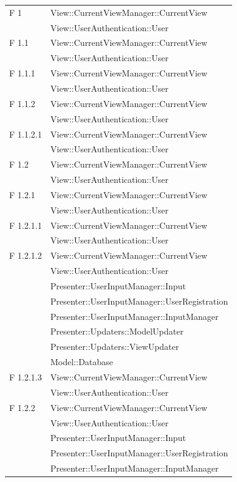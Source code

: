 \documentclass[a4paper,11pt]{article}
\begin{document}
\begin{longtable}{p{}p{}}
F 1 & View::CurrentViewManager::CurrentView\\
	& View::UserAuthentication::User\\
\midrule
F 1.1 & View::CurrentViewManager::CurrentView\\
	& View::UserAuthentication::User\\
\midrule
F 1.1.1 & View::CurrentViewManager::CurrentView\\
	& View::UserAuthentication::User\\
\midrule
F 1.1.2 & View::CurrentViewManager::CurrentView\\
	& View::UserAuthentication::User\\
\midrule
F 1.1.2.1 & View::CurrentViewManager::CurrentView\\
	& View::UserAuthentication::User\\
\midrule
F 1.2 & View::CurrentViewManager::CurrentView\\
	& View::UserAuthentication::User\\
\midrule
F 1.2.1 & View::CurrentViewManager::CurrentView\\
	& View::UserAuthentication::User\\
\midrule
F 1.2.1.1 & View::CurrentViewManager::CurrentView\\
	& View::UserAuthentication::User\\
\midrule
F 1.2.1.2 & View::CurrentViewManager::CurrentView\\
			& View::UserAuthentication::User\\
			& Presenter::UserInputManager::Input\\
			& Presenter::UserInputManager::UserRegistration\\
			& Presenter::UserInputManager::InputManager\\
			& Presenter::Updaters::ModelUpdater\\
			& Presenter::Updaters::ViewUpdater\\
			& Model::Database\\
\midrule
F 1.2.1.3 	& View::CurrentViewManager::CurrentView\\
			& View::UserAuthentication::User\\
\midrule
F 1.2.2 & View::CurrentViewManager::CurrentView\\
			& View::UserAuthentication::User\\
			& Presenter::UserInputManager::Input\\
			& Presenter::UserInputManager::UserRegistration\\
			& Presenter::UserInputManager::InputManager\\

\end{longtable}
\end{document}

